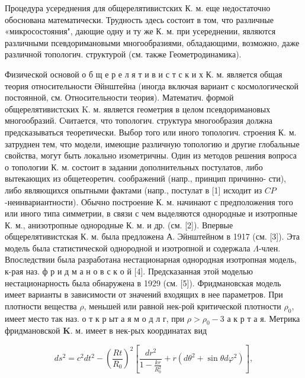 \documentclass[10pt]{article}
\begin{document}
Процедура усереднения для общерелятивистских К. м. еще недостаточно обоснована математически. Трудность здесь состоит в том, что различные «микросостояния", дающие одну и ту же К. м. при усереднении, являются различными псевдоримановыми многообразиями, обладающими, возможно, даже различной топологич. структурой (см. также Геометродинамика).



Физической основой о б щ е р е л я т и в и с т с к и х К. м. является общая теория относительности Әйнштейна (иногда включая вариант с космологической постоянной, см. Относительности теория). Математич. формой общерелятивистских $\mathrm{K}$. м. является геометрия в целом псевдоримановых многообразий. Считается, что топологич. структура многообразия должна предсказываться теоретически. Выбор того или иного топологич. строения К. м. затруднен тем, что модели, имеющие различную топологию и другие глобальные свойства, могут быть локально изометричны. Один из методов решения вопроса о топологии К. м. состоит в задании дополнительных постулатов, либо вытекающих из общетеоретич. соображений (напр., принцип причинно- сти), либо являющихся опытными фактами (напр., постулат в [1] исходит из $C P$-неинвариантности). Обычно построение К. м. начинают с предположения того или иного типа симметрии, в связи с чем выделяются однородные и изотропные К. м., анизотропные однородные К. м. и др. (см. [2]). Впервые общерелятивистская К. м. была предложена А. Эйнштейном в 1917 (см. [3]). Эта модель была статистической однородной и изотропной и содержала $\Lambda$-член. Впоследствии была разработана нестационарная однородная изотропная модель, к-рая наз. ф р и д м а н о в с к о й [4]. Предсказанная этой моделью нестационарность была обнаружена в 1929 (см. [5]). Фридмановская модель имеет варианты в зависимости от значений входящих в нее параметров. При плотности вещества $\rho$, меньшей или равной нек-рой критической плотности $\rho_{0}$, имеет место так наз. о т к р ыт а я м о д л г, при $\rho>\rho_{0}-3$ а к р т а я. Метрика фридмановской $\boldsymbol{K}$. м. имеет в нек-рых координатах вид



\[

d s^{2}=c^{2} d t^{2}-\left(\frac{R t}{R_{0}}\right)^{2}\left[\frac{d r^{2}}{1-\frac{k r}{R_{0}^{2}}}+r\left(d \theta^{2}+\sin \theta d \varphi^{2}\right)\right],

\]
\end{document}
